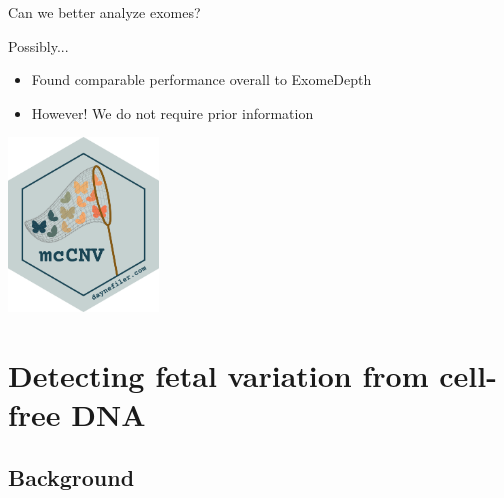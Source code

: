\documentclass[
  10pt,
  ignorenonframetext,
  m]{beamer}
\begin{document}
\begin{frame}{Can we better analyze exomes?}
\protect\hypertarget{can-we-better-analyze-exomes-8}{}

\bigskip

\centering\Huge\textcolor{uncnavy}{Possibly...}

\bigskip
\raggedright\normalsize

\begin{itemize}
\item
  Found comparable performance overall to ExomeDepth
\item
  However! We do not require prior information
\end{itemize}

\hfill \includegraphics[width=0.3\textwidth,height=\textheight]{images/mcCNV.png}

\end{frame}

\hypertarget{detecting-fetal-variation-from-cell-free-dna}{%
\section{Detecting fetal variation from cell-free
DNA}\label{detecting-fetal-variation-from-cell-free-dna}}

\hypertarget{background}{%
\subsection{Background}\label{background}}
\end{document}
